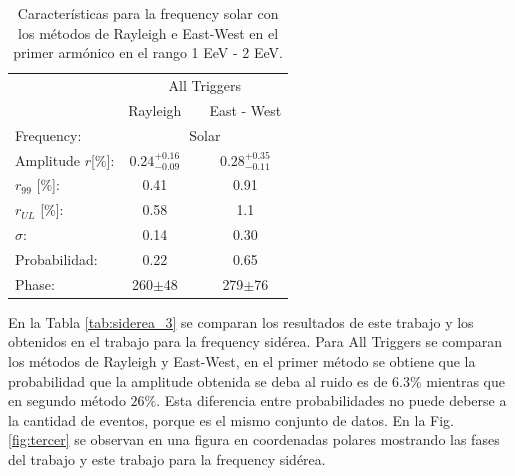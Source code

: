 \documentclass[12pt, doublespace, oneside]{article}
\begin{document}
    \begin{table}[H]
        \vspace*{-0.81 cm}
        \begin{small}
            \begin{center}
                \begin{tabular}[c]{l|c|c|c|}
                    \cline{2-4}         & \multicolumn{3}{c|}{All Triggers} \\ \cline{2-4}
                                        & Rayleigh   &                   & East - West            \\\hline
\multicolumn{1}{|l|}{Frequency:}       & \multicolumn{3}{c|}{Solar}        \\
\multicolumn{1}{|l|}{Amplitude $r$[\%]:} & $0.24^{+0.16}_{-0.09}$&         & $0.28^{+0.35}_{-0.11}$ \\
\multicolumn{1}{|l|}{$r_{99}$ [\%]:   } & 0.41                  &         & 0.91       \\
\multicolumn{1}{|l|}{$r_{UL}$ [\%]:   } & 0.58                  &        & 1.1       \\
\multicolumn{1}{|l|}{$\sigma$:        } & 0.14                  &         & 0.30          \\\hline
\multicolumn{1}{|l|}{Probabilidad:    } & 0.22                  &          & 0.65          \\
\multicolumn{1}{|l|}{Phase:            } & 260$\pm$48            &         & 279$\pm$76    \\\hline
                \end{tabular}
            \end{center}
            \vspace*{-0.41 cm}
        \end{small}
        \caption{Características para la frequency solar con los métodos de Rayleigh  e East-West en el primer armónico en el rango 1 EeV - 2 EeV.}
        \label{tab:solar_3}
    \end{table}
    


    En la Tabla \ref{tab:siderea_3} se comparan los resultados de este trabajo y los obtenidos en el trabajo \cite{Aab_2020} para la frequency sidérea. Para All Triggers se comparan los métodos de Rayleigh y East-West, en el primer método se obtiene que la probabilidad que la amplitude obtenida se deba al ruido es de $6.3\%$ mientras que en segundo método $26\%$. Esta diferencia entre probabilidades no puede deberse a la cantidad de eventos, porque es el mismo conjunto de datos. En la Fig.\ref{fig:tercer} se observan en una figura en coordenadas polares mostrando las fases del trabajo \cite{Aab_2020} y este trabajo para la frequency sidérea.
\end{document}
